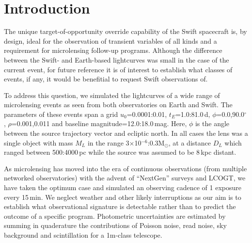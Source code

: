 \documentclass[preprint2]{aastex}
\newcommand{\Msol}{M$_{\odot}$}
\begin{document}

\section{Introduction}

The unique target-of-opportunity override capability of the Swift spacecraft is, by design, ideal for the observation of transient variables of all kinds and a requirement for microlensing follow-up programs.  Although the difference between the Swift- and Earth-based lightcurves was small in the case of the current event, for future reference it is of interest to establish what classes of events, if any, it would be benefitial to request Swift observations of.  

To address this question, we simulated the lightcurves of a wide range of microlensing events as seen from both observatories on Earth and Swift.  The parameters of these events span a grid $u_{0}$={0.0001:0.01}, $t_{E}$={1.0:81.0}\,d, $\phi$={0.0,90.0}$^{\circ}$, $\rho$={0.001,0.011} and baseline magnitude={12.0:18.0}\,mag.  Here, $\phi$ is the angle between the source trajectory vector and ecliptic north.  In all cases the lens was a single object with mass $M_{L}$ in the range {3$\times$10$^{-6}$:0.3}\Msol, at a distance $D_{L}$ which ranged between {500:4000}\,pc while the source was assumed to be 8\,kpc distant.  

As microlensing has moved into the era of continuous observations (from multiple networked observatories) with the advent of ``NextGen'' surveys and LCOGT, we have taken the optimum case and simulated an observing cadence of 1 exposure every 15\,min.  We neglect weather and other likely interruptions as our aim is to establish what observational signature is detectable rather than to predict the outcome of a specific program.  Photometric uncertainties are estimated by summing in quaderature the  contributions of Poisson noise, read noise, sky background and scintillation for a 1m-class telescope.  
\end{document}

